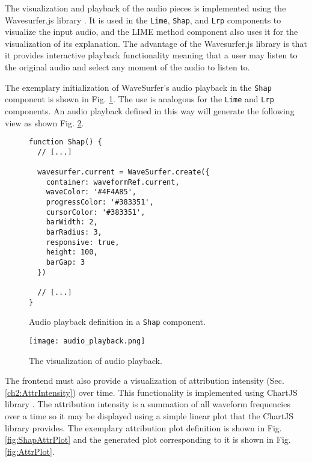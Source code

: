 \documentclass[
    bindingoffset=5mm,  %
    footnoteindent=3mm, %
    hyphenation=true    %
]{src/wut-thesis}
\begin{document}
The visualization and playback of the audio pieces is implemented using the Wavesurfer.js
library \cite{WavesurferDOC}. It is used in the \texttt{Lime}, \texttt{Shap}, and \texttt{Lrp}
components to visualize the input audio, and the LIME method component also uses it for the
visualization of its explanation. The advantage of the Wavesurfer.js library is that it
provides interactive playback functionality meaning that a user may listen to the original
audio and select any moment of the audio to listen to.

The exemplary initialization of WaveSurfer's audio playback in the \texttt{Shap} component is shown
in Fig. \ref{fig:ShapAudioPlayback}. The use is analogous for the \texttt{Lime} and \texttt{Lrp} components.
An audio playback defined in this way will generate the following view as shown Fig. \ref{fig:AudioPlayback}.

\begin{figure}%
\begin{verbatim}
function Shap() {
  // [...]

  wavesurfer.current = WaveSurfer.create({
    container: waveformRef.current,
    waveColor: '#4F4A85',
    progressColor: '#383351',
    cursorColor: '#383351',
    barWidth: 2,
    barRadius: 3,
    responsive: true,
    height: 100,
    barGap: 3
  })

  // [...]
}
\end{verbatim}
\caption{Audio playback definition in a \texttt{Shap} component.}
\label{fig:ShapAudioPlayback}
\end{figure}

\begin{figure}[h!] %
    \centering
    \texttt{[image: audio\_playback.png]}
    \caption{The visualization of audio playback.}
    \label{fig:AudioPlayback}
\end{figure}


The frontend must also provide a visualization of attribution intensity (Sec. \ref{ch2:AttrIntensity}) over time.
This functionality is implemented using ChartJS library \cite{ChartJsDoc}.
The attribution intensity is a summation of all waveform frequencies over a time so it may
be displayed using a simple linear plot that the ChartJS library provides.
The exemplary attribution plot definition is shown in Fig. \ref{fig:ShapAttrPlot}
and the generated plot corresponding to it is shown in Fig. \ref{fig:AttrPlot}.
\end{document}

